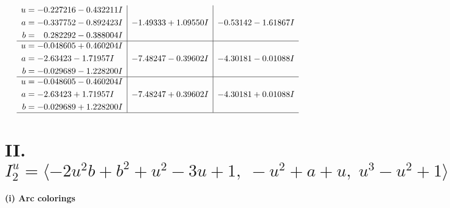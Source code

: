\documentclass[1p]{elsarticle_modified}
\theoremstyle{definition}
\begin{document}
$$\begin{array}{c|c|c}
\begin{aligned}
u &= -0.227216 - 0.432211 I \\
a &= -0.337752 - 0.892423 I \\
b &= \phantom{-}0.282292 - 0.388004 I\end{aligned}
 & -1.49333 + 1.09550 I & -0.53142 - 1.61867 I \\ \hline\begin{aligned}
u &= -0.048605 + 0.460204 I \\
a &= -2.63423 - 1.71957 I \\
b &= -0.029689 - 1.228200 I\end{aligned}
 & -7.48247 - 0.39602 I & -4.30181 - 0.01088 I \\ \hline\begin{aligned}
u &= -0.048605 - 0.460204 I \\
a &= -2.63423 + 1.71957 I \\
b &= -0.029689 + 1.228200 I\end{aligned}
 & -7.48247 + 0.39602 I & -4.30181 + 0.01088 I\\
 \hline 
 \end{array}$$\newpage\newpage\renewcommand{\arraystretch}{1}
\centering \section*{II. $I^u_{2}= \langle -2 u^2 b+b^2+u^2-3 u+1,\;- u^2+a+u,\;u^3- u^2+1 \rangle$}
\flushleft \textbf{(i) Arc colorings}\\
\end{document}
